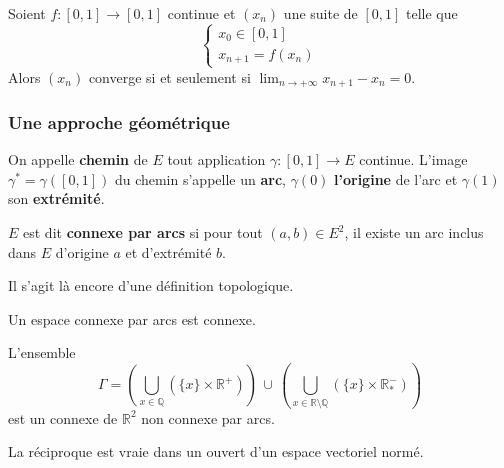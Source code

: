 	\begin{corollary}
		Soient $f : [0, 1] \rightarrow [0, 1]$ continue et $(x_n)$ une suite de $[0, 1]$ telle que
		\[ \begin{cases} x_0 \in [0, 1] \\ x_{n+1} = f(x_n) \end{cases} \]
		Alors $(x_n)$ converge si et seulement si $\lim_{n \rightarrow +\infty } x_{n+1} - x_n = 0$.
	\end{corollary}

	\subsubsection{Une approche géométrique}


	\begin{definition}
		On appelle \textbf{chemin} de $E$ tout application $\gamma : [0,1] \rightarrow E$ continue. L'image $\gamma^* = \gamma([0,1])$ du chemin s'appelle un \textbf{arc}, $\gamma(0)$ \textbf{l'origine} de l'arc et $\gamma(1)$ son \textbf{extrémité}.
	\end{definition}

	\begin{definition}
		$E$ est dit \textbf{connexe par arcs} si pour tout $(a,b) \in E^2$, il existe un arc inclus dans $E$ d'origine $a$ et d'extrémité $b$.
	\end{definition}

	\begin{remark}
		Il s'agit là encore d'une définition topologique.
	\end{remark}

	\begin{theorem}
		Un espace connexe par arcs est connexe.
	\end{theorem}

	\begin{cexample}
		L'ensemble
		\[
			\Gamma = \left( \bigcup_{x \in \mathbb{Q}} (\{ x \} \times \mathbb{R}^+) \right) \, \cup \, \left( \bigcup_{x \in \mathbb{R} \setminus \mathbb{Q}} (\{ x \} \times \mathbb{R}^-_*) \right)
		\]
		est un connexe de $\mathbb{R}^2$ non connexe par arcs.
	\end{cexample}

	\begin{proposition}
		La réciproque est vraie dans un ouvert d'un espace vectoriel normé.
	\end{proposition}

